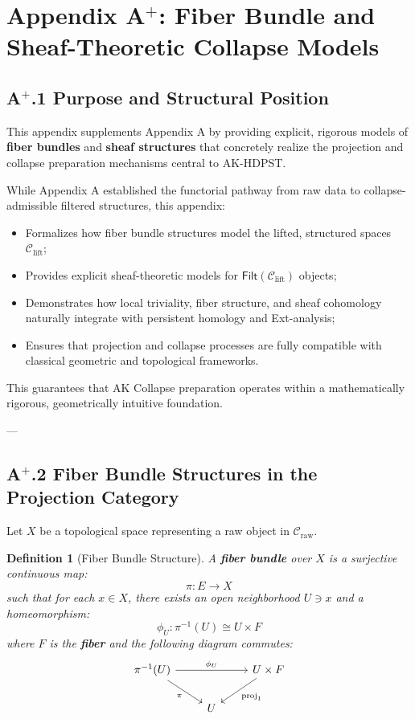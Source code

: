 \documentclass[11pt]{article}
\newtheorem{definition}[theorem]{Definition}
\begin{document}
\section*{Appendix A$^{+}$: Fiber Bundle and Sheaf-Theoretic Collapse Models}

\subsection*{A$^{+}$.1 Purpose and Structural Position}

This appendix supplements Appendix A by providing explicit, rigorous models of \textbf{fiber bundles} and \textbf{sheaf structures} that concretely realize the projection and collapse preparation mechanisms central to AK-HDPST.

While Appendix A established the functorial pathway from raw data to collapse-admissible filtered structures, this appendix:

\begin{itemize}
    \item Formalizes how fiber bundle structures model the lifted, structured spaces $\mathcal{C}_{\mathrm{lift}}$;
    \item Provides explicit sheaf-theoretic models for $\mathsf{Filt}(\mathcal{C}_{\mathrm{lift}})$ objects;
    \item Demonstrates how local triviality, fiber structure, and sheaf cohomology naturally integrate with persistent homology and Ext-analysis;
    \item Ensures that projection and collapse processes are fully compatible with classical geometric and topological frameworks.
\end{itemize}

This guarantees that AK Collapse preparation operates within a mathematically rigorous, geometrically intuitive foundation.

---

\subsection*{A$^{+}$.2 Fiber Bundle Structures in the Projection Category}

Let $X$ be a topological space representing a raw object in $\mathcal{C}_{\mathrm{raw}}$.

\begin{definition}[Fiber Bundle Structure]
A \textbf{fiber bundle} over $X$ is a surjective continuous map:
\[
\pi : E \longrightarrow X
\]
such that for each $x \in X$, there exists an open neighborhood $U \ni x$ and a homeomorphism:
\[
\phi_U : \pi^{-1}(U) \cong U \times F
\]
where $F$ is the \textbf{fiber} and the following diagram commutes:
\[
\begin{tikzcd}
\pi^{-1}(U) \arrow[rr, "\phi_U"] \arrow[dr, "\pi"']
& & U \times F \arrow[dl, "\mathrm{proj}_1"] \\
& U &
\end{tikzcd}
\]
\end{definition}
\end{document}
